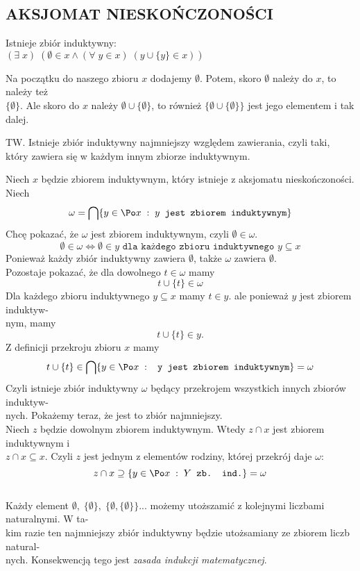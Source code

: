 \documentclass{article}
\begin{document}
\subsection{AKSJOMAT NIESKOŃCZONOŚCI}
\begin{center}\large
    Istnieje {\color{emp}zbiór induktywny}:\smallskip\\
    $(\exists\;x)\;(\emptyset\in x\land (\forall\;y\in x)\;(y\cup\{y\}\in x))$
\end{center}
Na początku do naszego zbioru $x$ dodajemy $\emptyset$. Potem, skoro $\emptyset$ należy do $x$, to należy też \\$\{\emptyset\}$. Ale skoro do $x$ należy $\emptyset\cup\{\emptyset\}$, to również $\{\emptyset\cup\{\emptyset\}\}$ jest jego elementem i tak dalej.\bigskip\\
\bigskip
\begin{center}\large
    {\color{def}TW.} Istnieje zbiór induktywny najmniejszy względem zawierania, czyli taki, który zawiera się w każdym innym zbiorze induktywnym.
\end{center}\bigskip
\dowod
Niech $x$ będzie zbiorem induktywnym, który istnieje z aksjomatu nieskończoności. Niech
$$\omega=\bigcap\{y\in\Po x\;:\;y \texttt{ jest zbiorem induktywnym}\}$$
Chcę pokazać, że $\omega$ jest zbiorem induktywnym, czyli $\emptyset\in\omega$.
$$\emptyset\in\omega\iff\emptyset\in y \texttt{ dla każdego zbioru induktywnego }y\subseteq x$$
Ponieważ każdy zbiór induktywny zawiera $\emptyset$, także $\omega$ zawiera $\emptyset$.\medskip\\
Pozostaje pokazać, że dla dowolnego $t\in\omega$ mamy
$$t\cup\{t\}\in \omega$$
Dla każdego zbioru induktywnego $y\subseteq x$ mamy $t\in y$. ale ponieważ $y$ jest zbiorem induktyw-\\nym, mamy 
$$t\cup\{t\}\in y.$$
Z definicji przekroju zbioru $x$ mamy
$$t\cup\{t\}\in \bigcap \{y\in \Po x\;:\;\texttt{ y jest zbiorem induktywnym}\}=\omega$$
Czyli istnieje zbiór induktywny $\omega$ będący przekrojem wszystkich innych zbiorów induktyw-\\nych. Pokażemy teraz, że jest to zbiór najmniejszy.\medskip\\
Niech $z$ będzie dowolnym zbiorem induktywnym. Wtedy $z\cap x$ jest zbiorem induktywnym i \\$z\cap x\subseteq x$. Czyli $z$ jest jednym z elementów rodziny, której przekrój daje $\omega$:
$$z\cap x\supseteq \{y\in\Po x\;:\; Y\texttt{ zb. ind.}\}=\omega$$
\kondow
{}\bigskip\\
Każdy element $\emptyset,\;\{\emptyset\},\;\{\emptyset,\{\emptyset\}\}...$ możemy utoższamić z {\color{acc}kolejnymi liczbami naturalnymi}. W ta-\\kim razie ten najmniejszy zbiór induktywny będzie utożsamiany ze zbiorem liczb natural-\\nych. Konsekwencją tego jest \emph{\color{emp}zasada indukcji matematycznej}.\smallskip\\
\end{document}
